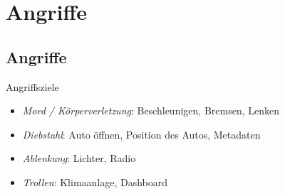 \section{Angriffe}

\subsection{Angriffe}

\begin{frame}{Angriffsziele}
    \begin{itemize}
        \item \textit{Mord / Körperverletzung}: Beschleunigen, Bremsen, Lenken
        \item \textit{Diebstahl}: Auto öffnen, Position des Autos, Metadaten
        \item \textit{Ablenkung}: Lichter, Radio
        \item \textit{Trollen}: Klimaanlage, Dashboard
    \end{itemize}
\end{frame}

